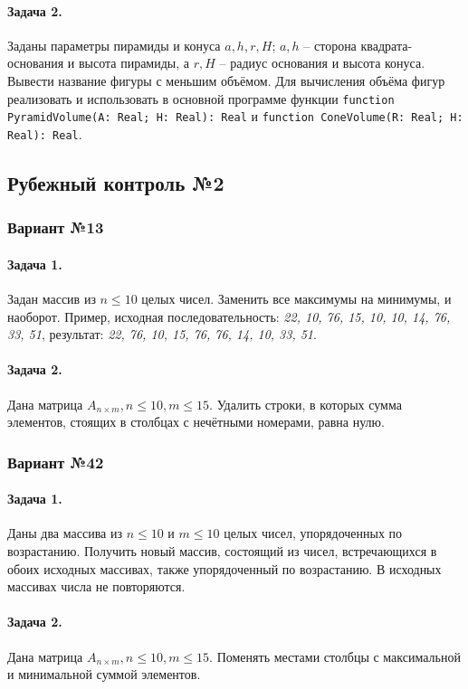 \documentclass[12pt,a4paper]{report}
\begin{document}
\paragraph*{Задача 2.} Заданы параметры пирамиды и конуса $a, h, r, H$; $a, h$ -- сторона квадрата-основания и высота пирамиды, а $r, H$ -- радиус основания и высота конуса. Вывести название фигуры с меньшим объёмом. Для вычисления объёма фигур реализовать и использовать в основной программе функции \texttt{function PyramidVolume(A: Real; H: Real): Real} и \texttt{function ConeVolume(R: Real; H: Real): Real}.




\clearpage
\subsection*{Рубежный контроль №2}
\subsubsection*{Вариант №13}
\paragraph*{Задача 1.} Задан массив из $n \le 10$ целых чисел. Заменить все максимумы на минимумы, и наоборот.
Пример, исходная последовательность: \textit{22, 10, 76, 15, 10, 10, 14, 76, 33, 51}, результат: \textit{22, 76, 10, 15, 76, 76, 14, 10, 33, 51}.
\paragraph*{Задача 2.} Дана матрица $A_{n \times m}, n \le 10, m \le 15$. Удалить строки, в которых сумма элементов, стоящих в столбцах с нечётными номерами, равна нулю.
\subsubsection*{Вариант №42}
\paragraph*{Задача 1.} Даны два массива из $n \le 10$ и $m \le 10$ целых чисел, упорядоченных по возрастанию. Получить новый массив, состоящий из чисел, встречающихся в обоих исходных массивах, также упорядоченный по возрастанию. В исходных массивах числа не повторяются.
\paragraph*{Задача 2.} Дана матрица $A_{n \times m}, n \le 10, m \le 15$. Поменять местами столбцы с максимальной и минимальной суммой элементов.
\end{document}
